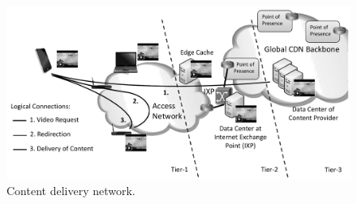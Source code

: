 





\begin{figure}[bt]
\centering
	\includegraphics[width=\textwidth]{aslevel/figs/cdn}
 	\caption{Content delivery network.}
 	\label{fig:aslevel:cdn}
\end{figure}


